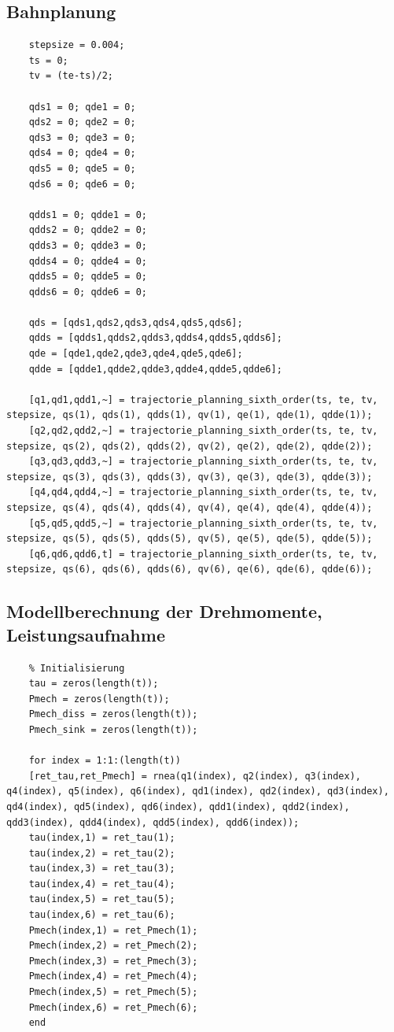 \subsection*{Bahnplanung}
%
\begin{lstlisting}
	stepsize = 0.004;
	ts = 0;
	tv = (te-ts)/2;
	
	qds1 = 0; qde1 = 0;
	qds2 = 0; qde2 = 0;
	qds3 = 0; qde3 = 0;
	qds4 = 0; qde4 = 0;
	qds5 = 0; qde5 = 0;
	qds6 = 0; qde6 = 0;
	
	qdds1 = 0; qdde1 = 0;
	qdds2 = 0; qdde2 = 0;
	qdds3 = 0; qdde3 = 0;
	qdds4 = 0; qdde4 = 0;
	qdds5 = 0; qdde5 = 0;
	qdds6 = 0; qdde6 = 0;
	
	qds = [qds1,qds2,qds3,qds4,qds5,qds6];
	qdds = [qdds1,qdds2,qdds3,qdds4,qdds5,qdds6];
	qde = [qde1,qde2,qde3,qde4,qde5,qde6];
	qdde = [qdde1,qdde2,qdde3,qdde4,qdde5,qdde6];
	
	[q1,qd1,qdd1,~] = trajectorie_planning_sixth_order(ts, te, tv, stepsize, qs(1), qds(1), qdds(1), qv(1), qe(1), qde(1), qdde(1));
	[q2,qd2,qdd2,~] = trajectorie_planning_sixth_order(ts, te, tv, stepsize, qs(2), qds(2), qdds(2), qv(2), qe(2), qde(2), qdde(2));
	[q3,qd3,qdd3,~] = trajectorie_planning_sixth_order(ts, te, tv, stepsize, qs(3), qds(3), qdds(3), qv(3), qe(3), qde(3), qdde(3));
	[q4,qd4,qdd4,~] = trajectorie_planning_sixth_order(ts, te, tv, stepsize, qs(4), qds(4), qdds(4), qv(4), qe(4), qde(4), qdde(4));
	[q5,qd5,qdd5,~] = trajectorie_planning_sixth_order(ts, te, tv, stepsize, qs(5), qds(5), qdds(5), qv(5), qe(5), qde(5), qdde(5));
	[q6,qd6,qdd6,t] = trajectorie_planning_sixth_order(ts, te, tv, stepsize, qs(6), qds(6), qdds(6), qv(6), qe(6), qde(6), qdde(6));
\end{lstlisting}
%
\subsection*{Modellberechnung der Drehmomente, Leistungsaufnahme}
%
\begin{lstlisting}
	% Initialisierung
	tau = zeros(length(t));
	Pmech = zeros(length(t));
	Pmech_diss = zeros(length(t));
	Pmech_sink = zeros(length(t));
	
	for index = 1:1:(length(t))
	[ret_tau,ret_Pmech] = rnea(q1(index), q2(index), q3(index), q4(index), q5(index), q6(index), qd1(index), qd2(index), qd3(index), qd4(index), qd5(index), qd6(index), qdd1(index), qdd2(index), qdd3(index), qdd4(index), qdd5(index), qdd6(index));
	tau(index,1) = ret_tau(1);
	tau(index,2) = ret_tau(2);
	tau(index,3) = ret_tau(3);
	tau(index,4) = ret_tau(4);
	tau(index,5) = ret_tau(5);
	tau(index,6) = ret_tau(6);
	Pmech(index,1) = ret_Pmech(1);
	Pmech(index,2) = ret_Pmech(2);
	Pmech(index,3) = ret_Pmech(3);
	Pmech(index,4) = ret_Pmech(4);
	Pmech(index,5) = ret_Pmech(5);
	Pmech(index,6) = ret_Pmech(6);
	end
\end{lstlisting}
%
